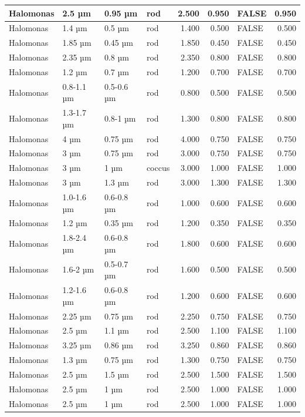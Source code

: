 \documentclass[
]{article}
\begin{document}
\begin{table}
\begin{tabular}{l|l|l|l|r|r|l|r}
\hline
Halomonas & 2.5 µm & 0.95 µm & rod & 2.500 & 0.950 & FALSE & 0.950\\
\hline
Halomonas & 1.4 µm & 0.5 µm & rod & 1.400 & 0.500 & FALSE & 0.500\\
\hline
Halomonas & 1.85 µm & 0.45 µm & rod & 1.850 & 0.450 & FALSE & 0.450\\
\hline
Halomonas & 2.35 µm & 0.8 µm & rod & 2.350 & 0.800 & FALSE & 0.800\\
\hline
Halomonas & 1.2 µm & 0.7 µm & rod & 1.200 & 0.700 & FALSE & 0.700\\
\hline
Halomonas & 0.8-1.1 µm & 0.5-0.6 µm & rod & 0.800 & 0.500 & FALSE & 0.500\\
\hline
Halomonas & 1.3-1.7 µm & 0.8-1 µm & rod & 1.300 & 0.800 & FALSE & 0.800\\
\hline
Halomonas & 4 µm & 0.75 µm & rod & 4.000 & 0.750 & FALSE & 0.750\\
\hline
Halomonas & 3 µm & 0.75 µm & rod & 3.000 & 0.750 & FALSE & 0.750\\
\hline
Halomonas & 3 µm & 1 µm & coccus & 3.000 & 1.000 & FALSE & 1.000\\
\hline
Halomonas & 3 µm & 1.3 µm & rod & 3.000 & 1.300 & FALSE & 1.300\\
\hline
Halomonas & 1.0-1.6 µm & 0.6-0.8 µm & rod & 1.000 & 0.600 & FALSE & 0.600\\
\hline
Halomonas & 1.2 µm & 0.35 µm & rod & 1.200 & 0.350 & FALSE & 0.350\\
\hline
Halomonas & 1.8-2.4 µm & 0.6-0.8 µm & rod & 1.800 & 0.600 & FALSE & 0.600\\
\hline
Halomonas & 1.6-2 µm & 0.5-0.7 µm & rod & 1.600 & 0.500 & FALSE & 0.500\\
\hline
Halomonas & 1.2-1.6 µm & 0.6-0.8 µm & rod & 1.200 & 0.600 & FALSE & 0.600\\
\hline
Halomonas & 2.25 µm & 0.75 µm & rod & 2.250 & 0.750 & FALSE & 0.750\\
\hline
Halomonas & 2.5 µm & 1.1 µm & rod & 2.500 & 1.100 & FALSE & 1.100\\
\hline
Halomonas & 3.25 µm & 0.86 µm & rod & 3.250 & 0.860 & FALSE & 0.860\\
\hline
Halomonas & 1.3 µm & 0.75 µm & rod & 1.300 & 0.750 & FALSE & 0.750\\
\hline
Halomonas & 2.5 µm & 1.5 µm & rod & 2.500 & 1.500 & FALSE & 1.500\\
\hline
Halomonas & 2.5 µm & 1 µm & rod & 2.500 & 1.000 & FALSE & 1.000\\
\hline
Halomonas & 2.5 µm & 1 µm & rod & 2.500 & 1.000 & FALSE & 1.000\\

\end{tabular}
\end{table}
\end{document}
